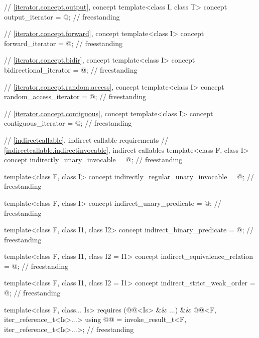 \begin{codeblock}
{  // \ref{iterator.concept.output}, concept 
  template<class I, class T>
    concept output_iterator = @\seebelow@;                                            // freestanding

  // \ref{iterator.concept.forward}, concept 
  template<class I>
    concept forward_iterator = @\seebelow@;                                           // freestanding

  // \ref{iterator.concept.bidir}, concept 
  template<class I>
    concept bidirectional_iterator = @\seebelow@;                                     // freestanding

  // \ref{iterator.concept.random.access}, concept 
  template<class I>
    concept random_access_iterator = @\seebelow@;                                     // freestanding

  // \ref{iterator.concept.contiguous}, concept 
  template<class I>
    concept contiguous_iterator = @\seebelow@;                                        // freestanding

  // \ref{indirectcallable}, indirect callable requirements
  // \ref{indirectcallable.indirectinvocable}, indirect callables
  template<class F, class I>
    concept indirectly_unary_invocable = @\seebelow@;                                 // freestanding

  template<class F, class I>
    concept indirectly_regular_unary_invocable = @\seebelow@;                         // freestanding

  template<class F, class I>
    concept indirect_unary_predicate = @\seebelow@;                                   // freestanding

  template<class F, class I1, class I2>
    concept indirect_binary_predicate = @\seebelow@;                                  // freestanding

  template<class F, class I1, class I2 = I1>
    concept indirect_equivalence_relation = @\seebelow@;                              // freestanding

  template<class F, class I1, class I2 = I1>
    concept indirect_strict_weak_order = @\seebelow@;                                 // freestanding

  template<class F, class... Is>
    requires (@@<Is> && ...) && @@<F, iter_reference_t<Is>...>
      using @@ = invoke_result_t<F, iter_reference_t<Is>...>;        // freestanding

}
\end{codeblock}
